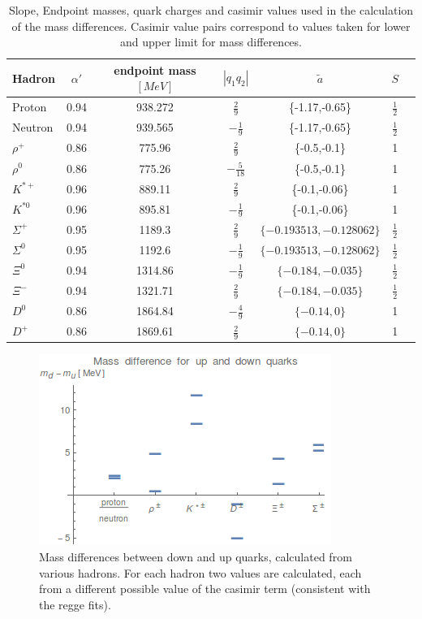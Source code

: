 \documentclass[11pt,a4paper]{article}
\begin{document}
\begin{table}
\centering
\begin{tabular}{|l|c|c|c|c|c|c|}
\hline
 Hadron & $\alpha'$ & endpoint mass$\left[MeV\right]$ & $|q_1q_2|$ & $\tilde{a}$ & $S$ \\ 
 \hline
Proton & 0.94 & 938.272 & $\frac{2}{9}$ & \{-1.17,-0.65\} & $\frac{1}{2}$  \\
Neutron & 0.94 & 939.565 & $-\frac{1}{9}$ & \{-1.17,-0.65\} & $\frac{1}{2}$  \\
$\rho^{+}$ & 0.86 & 775.96 & $\frac{2}{9}$ & \{-0.5,-0.1\} & 1  \\
$\rho^{0}$ & 0.86 & 775.26 & $-\frac{5}{18}$ & \{-0.5,-0.1\} & 1  \\
$K^{*+}$ & 0.96 & 889.11 & $\frac{2}{9}$ & \{-0.1,-0.06\} & 1  \\
$K^{*0}$ & 0.96 & 895.81 & $-\frac{1}{9}$ & \{-0.1,-0.06\} & 1  \\
$\Sigma^+$ & 0.95 & 1189.3 & $\frac{2}{9}$ & $\{-0.193513,-0.128062\}$ & $\frac{1}{2}$  \\
$\Sigma^0$ & 0.95 & 1192.6 & $-\frac{1}{9}$ & $\{-0.193513,-0.128062\}$ & $\frac{1}{2}$  \\
$\Xi^0$ & 0.94 & 1314.86 & $-\frac{1}{9}$ & $\{-0.184,-0.035\}$ & $\frac{1}{2}$  \\
$\Xi^-$ & 0.94 & 1321.71 & $\frac{2}{9}$ & $\{-0.184,-0.035\}$ & $\frac{1}{2}$  \\
$D^0$ & 0.86 & 1864.84 & $-\frac{4}{9}$ & $\{-0.14,0\}$ & 1  \\
$D^+$ & 0.86 & 1869.61 & $\frac{2}{9}$ & $\{-0.14,0\}$ & 1  \\
\hline
\end{tabular}
\caption{Slope, Endpoint masses, quark charges and casimir values used in the calculation of the mass differences. Casimir value pairs correspond to values taken for lower and upper limit for mass differences.}
\label{tab:massdiffdata}
\end{table}

\begin{figure}[h]
\centering
\includegraphics[scale=1]{figures/MassDifferences.png}
\caption{Mass differences between down and up quarks, calculated from various hadrons. For each hadron two values are calculated, each from a different possible value of the casimir term (consistent with the regge fits).}
\label{fig:massdiff}
\end{figure}
\end{document}
